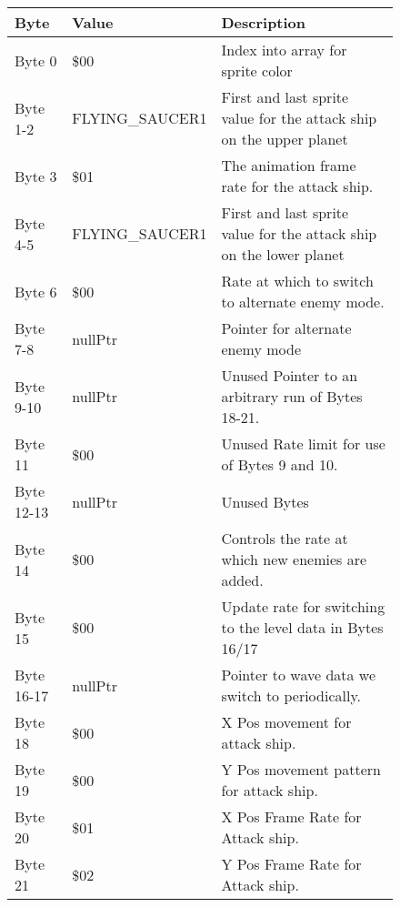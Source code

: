 \begin{figure}[H]
{\begin{adjustbox}{width=12cm}
\begin{tabular}{lll}
\toprule
 Byte       & Value                      & Description                                                         \\
\midrule
 Byte 0     & \$00                        & Index into array for sprite color                                   \\
 Byte 1-2   & FLYING\_SAUCER1             & First and last sprite value for the attack ship on the upper planet \\
 Byte 3     & \$01                        & The animation frame rate for the attack ship.                       \\
 Byte 4-5   & FLYING\_SAUCER1             & First and last sprite value for the attack ship on the lower planet \\
 Byte 6     & \$00                        & Rate at which to switch to alternate enemy mode.                    \\
 Byte 7-8   & nullPtr                    & Pointer for alternate enemy mode                                    \\
 Byte 9-10  & nullPtr                    & Unused Pointer to an arbitrary run of Bytes 18-21.                  \\
 Byte 11    & \$00                        & Unused Rate limit for use of Bytes 9 and 10.                        \\
 Byte 12-13 & nullPtr                    & Unused Bytes                                                        \\
 Byte 14    & \$00                        & Controls the rate at which new enemies are added.                   \\
 Byte 15    & \$00                        & Update rate for switching to the level data in Bytes 16/17          \\
 Byte 16-17 & nullPtr                    & Pointer to wave data we switch to periodically.                     \\
 Byte 18    & \$00                        & X Pos movement for attack ship.                                     \\
 Byte 19    & \$00                        & Y Pos movement pattern for attack ship.                             \\
 Byte 20    & \$01                        & X Pos Frame Rate for Attack ship.                                   \\
 Byte 21    & \$02                        & Y Pos Frame Rate for Attack ship.                                   \\

\end{tabular}
\end{adjustbox}}
\end{figure}
